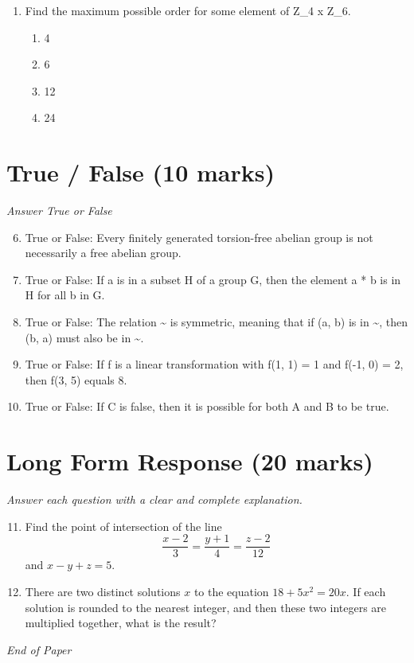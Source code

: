 \documentclass[12pt]{article}
\begin{document}
\begin{enumerate}[label=\arabic*.]
\begin{enumerate}[label=(\alph*)]
    \item 27
    \item 28
    \item 35
    \item 37
\end{enumerate}
\item Find the maximum possible order for some element of Z\_4 x Z\_6.
\begin{enumerate}[label=(\alph*)]
    \item 4
    \item 6
    \item 12
    \item 24
\end{enumerate}
\end{enumerate}

\section*{True / False (10 marks)}
\textit{Answer True or False}
\begin{enumerate}[label=\arabic*.]
\setcounter{enumi}{5}
\item True or False: Every finitely generated torsion-free abelian group is not necessarily a free abelian group.
\item True or False: If a is in a subset H of a group G, then the element a * b is in H for all b in G.
\item True or False: The relation \textasciitilde{} is symmetric, meaning that if (a, b) is in \textasciitilde{}, then (b, a) must also be in \textasciitilde{}.
\item True or False: If f is a linear transformation with f(1, 1) = 1 and f(-1, 0) = 2, then f(3, 5) equals 8.
\item True or False: If C is false, then it is possible for both A and B to be true.
\end{enumerate}

\section*{Long Form Response (20 marks)}
\textit{Answer each question with a clear and complete explanation.}
\begin{enumerate}[label=\arabic*.]
\setcounter{enumi}{10}
\item Find the point of intersection of the line \[\frac{x - 2}{3} = \frac{y + 1}{4} = \frac{z - 2}{12}\]and $x - y + z = 5.$
\item There are two distinct solutions $x$ to the equation $18+5 x^2=20 x$. If each solution is rounded to the nearest integer, and then these two integers are multiplied together, what is the result?
\end{enumerate}

\vfill
\noindent\textit{End of Paper}
\end{document}
